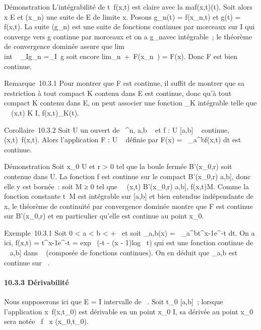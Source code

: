 \documentclass[]{article}
\begin{document}
Démonstration L'intégrabilité de t\mapsto~f(x,t) est
claire avec la ma\jmathoration \textbar{}f(x,t)\textbar{}\leq \phi(t). Soit alors x
\in E et (x\_n) une suite de E de limite x. Posons g\_n(t)
= f(x\_n,t) et g(t) = f(x,t). La suite (g\_n) est une
suite de fonctions continues par morceaux sur I qui converge vers g
continue par morceaux et on a \textbar{}g\_n\textbar{}\leq \phi avec \phi
intégrable~; le théorème de convergence dominée assure que
lim\\int ~
\_Ig\_n =\int  \_I~g soit
encore lim\_n\rightarrow~+\infty~F(x\_n~) =
F(x). Donc F est bien continue.

Remarque~10.3.1 Pour montrer que F est continue, il suffit de montrer
que sa restriction à tout compact K contenu dans E est continue, donc
qu'à tout compact K contenu dans E, on peut associer une fonction
\phi\_K intégrable telle que \forall~~(x,t) \in K \times
I, \textbar{}f(x,t)\textbar{}\leq \phi\_K(t).

Corollaire~10.3.2 Soit U un ouvert de ~^n, a,b \in {}~ et f : U \times
{[}a,b{]} \rightarrow~  continue, (x,t)\mapsto~f(x,t). Alors
l'application F : U \rightarrow~  définie par F(x) =\int ~
\_a^bf(x,t) dt est continue.

Démonstration Soit x\_0 \in U et r \textgreater{} 0 tel que la
boule fermée B'(x\_0,r) soit contenue dans U. La fonction f est
continue sur le compact B'(x\_0,r) \times {[}a,b{]}, donc elle y est
bornée~: soit M ≥ 0 tel que \forall~~(x,t) \in
B'(x\_0,r) \times {[}a,b{]}, \textbar{}f(x,t)\textbar{}\leq M. Comme la
fonction constante t\mapsto~M est intégrable sur
{[}a,b{]} et bien entendue indépendante de x, le théorème de continuité
par convergence dominée montre que F est continue sur B'(x\_0,r)
et en particulier qu'elle est continue au point x\_0.

Exemple~10.3.1 Soit 0 \textless{} a \textless{} b \textless{} +\infty~ et soit
\Gamma\_a,b(x) =\int ~
\_a^bt^x-1e^-t dt. On a ici, f(x,t) =
t^x-1e^-t = exp~ (-t - (x
- 1)log~ t) qui est une fonction continue de ~
\times {[}a,b{]} dans ~ (composée de fonctions continues). On en déduit que
\Gamma\_a,b est continue sur ~.

\paragraph{10.3.3 Dérivabilité}

Nous supposerons ici que E = I intervalle de ~. Soit t\_0 \in
{[}a,b{]}~; lorsque l'application
x\mapsto~f(x,t\_0) est dérivable en un point
x\_0 \in I, sa dérivée au point x\_0 sera notée  \partial~f
\over \partial~x (x\_0,t\_0).
\end{document}
